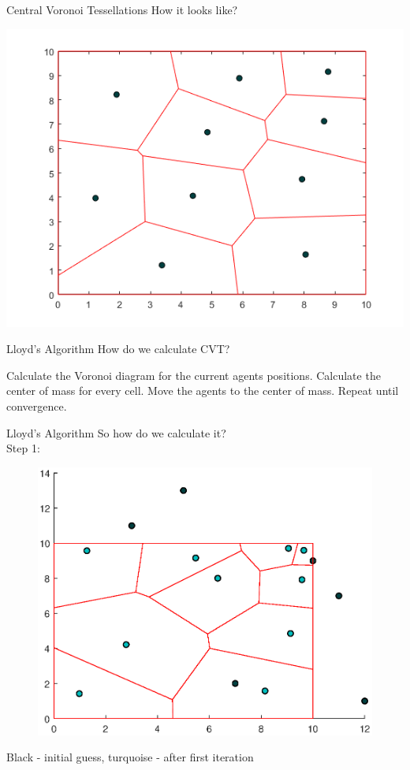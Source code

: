 \documentclass[t]{beamer}
\begin{document}
\begin{frame}[label=centvorpart3]{Central Voronoi Tessellations}
How it looks like?
\begin{center}
\includegraphics[scale=0.5]{background/central-Voronoi-example.png}
\end{center}
\end{frame}
\begin{frame}[label=lloydsalg1]{Lloyd's Algorithm}
How do we calculate CVT?
\begin{algorithm}[H]
\caption{Lloyd's Algorithm} \label{LloydAlgo}
\begin{algorithmic}[1]
\State Calculate the Voronoi diagram for the current agents positions.
\State Calculate the center of mass for every cell.
\State Move the agents to the center of mass.
\State Repeat until convergence.
\end{algorithmic}
\end{algorithm}
\end{frame}
\begin{frame}[label=lloydsalg2]{Lloyd's Algorithm}
So how do we calculate it?\\
Step 1:
\begin{figure}
\centering
\includegraphics[scale=0.4]{background/cvt-calc-step1.eps}
\end{figure}
Black - initial guess, turquoise - after first iteration
\end{frame}
\end{document}
